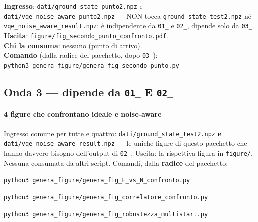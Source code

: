 \documentclass[11pt,a4paper]{article}
\newcommand{\code}[1]{\texttt{\small #1}}
\begin{document}
\begin{keyeq}[title={genera\_fig\_secondo\_punto.py}]
\textbf{Ingresso}: \code{dati/ground\_state\_punto2.npz} e
\code{dati/vqe\_noise\_aware\_punto2.npz} --- NON tocca
\code{ground\_state\_test2.npz} né \code{vqe\_noise\_aware\_result.npz}:
è indipendente da \code{01\_} e \code{02\_}, dipende solo da \code{03\_}.\\
\textbf{Uscita}: \code{figure/fig\_secondo\_punto\_confronto.pdf}.\\
\textbf{Chi la consuma}: nessuno (punto di arrivo).\\
\textbf{Comando} (dalla radice del pacchetto, dopo \code{03\_}):\\
\code{python3 genera\_figure/genera\_fig\_secondo\_punto.py}
\end{keyeq}

\subsection{Onda 3 --- dipende da \texorpdfstring{\code{01\_}}{01\_} E \texorpdfstring{\code{02\_}}{02\_}}

\paragraph{4 figure che confrontano ideale e noise-aware} Ingresso
comune per tutte e quattro: \code{dati/ground\_state\_test2.npz}
\textbf{e} \code{dati/vqe\_noise\_aware\_result.npz} --- le uniche
figure di questo pacchetto che hanno davvero bisogno dell'output di
\code{02\_}. Uscita: la rispettiva figura in \code{figure/}. Nessuna
consumata da altri script. Comandi, dalla \textbf{radice} del pacchetto:

\begin{keyeq}[title={genera\_fig\_F\_vs\_N\_confronto.py $\to$ fig\_F\_vs\_N\_confronto}]
\code{python3 genera\_figure/genera\_fig\_F\_vs\_N\_confronto.py}
\end{keyeq}

\begin{keyeq}[title={genera\_fig\_correlatore\_confronto.py $\to$ fig\_correlatore\_noise\_aware\_confronto}]
\code{python3 genera\_figure/genera\_fig\_correlatore\_confronto.py}
\end{keyeq}

\begin{keyeq}[title={genera\_fig\_robustezza\_multistart.py $\to$ fig\_robustezza\_multistart}]
\code{python3 genera\_figure/genera\_fig\_robustezza\_multistart.py}
\end{keyeq}
\end{document}

